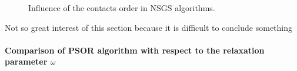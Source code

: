 \def\widthfigure{0.6}
\begin{figure}
  \centering\vspace{-0.5cm}
  \caption{Influence of the contacts order in NSGS algorithms.}
\end{figure}

\begin{ndrva}
  \item Not so great interest of this section because it is difficult to conclude something
\end{ndrva}

\paragraph{Comparison of PSOR algorithm with respect to  the relaxation parameter $\omega$}

